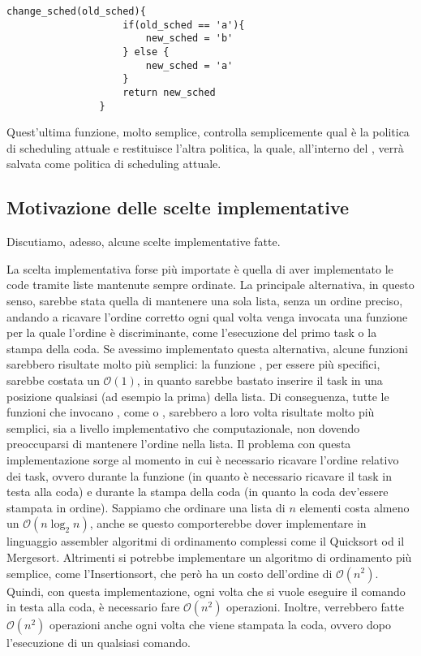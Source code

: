         \begin{center}
            \begin{lstlisting}[language=pseudo, gobble=14]
                change_sched(old_sched){
                    if(old_sched == 'a'){
                        new_sched = 'b'
                    } else {
                        new_sched = 'a'
                    }
                    return new_sched
                }\end{lstlisting}
        \end{center}
        
        Quest'ultima funzione, molto semplice, controlla semplicemente qual è la politica di scheduling attuale e restituisce l'altra politica, la quale, all'interno del , verrà salvata come politica di scheduling attuale.
    
    \subsection*{Motivazione delle scelte implementative}
    
        Discutiamo, adesso, alcune scelte implementative fatte.
        
        La scelta implementativa forse più importate è quella di aver implementato le code tramite liste mantenute sempre ordinate. La principale alternativa, in questo senso, sarebbe stata quella di mantenere una sola lista, senza un ordine preciso, andando a ricavare l'ordine corretto ogni qual volta venga invocata una funzione per la quale l'ordine è discriminante, come l'esecuzione del primo task o la stampa della coda. Se avessimo implementato questa alternativa, alcune funzioni sarebbero risultate molto più semplici: la funzione , per essere più specifici, sarebbe costata un $\mathcal{O}(1)$, in quanto sarebbe bastato inserire il task in una posizione qualsiasi (ad esempio la prima) della lista. Di conseguenza, tutte le funzioni che invocano , come  o , sarebbero a loro volta risultate molto più semplici, sia a livello implementativo che computazionale, non dovendo preoccuparsi di mantenere l'ordine nella lista. Il problema con questa implementazione sorge al momento in cui è necessario ricavare l'ordine relativo dei task, ovvero durante la funzione  (in quanto è necessario ricavare il task in testa alla coda) e durante la stampa della coda (in quanto la coda dev'essere stampata in ordine). Sappiamo che ordinare una lista di $n$ elementi costa almeno un $\mathcal{O}(n\log_2 n)$, anche se questo comporterebbe dover implementare in linguaggio assembler algoritmi di ordinamento complessi come il Quicksort od il Mergesort. Altrimenti si potrebbe implementare un algoritmo di ordinamento più semplice, come l'Insertionsort, che però ha un costo dell'ordine di $\mathcal{O}(n^2)$. Quindi, con questa implementazione, ogni volta che si vuole eseguire il comando in testa alla coda, è necessario fare $\mathcal{O}(n^2)$ operazioni. Inoltre, verrebbero fatte $\mathcal{O}(n^2)$ operazioni anche ogni volta che viene stampata la coda, ovvero dopo l'esecuzione di un qualsiasi comando.
        
